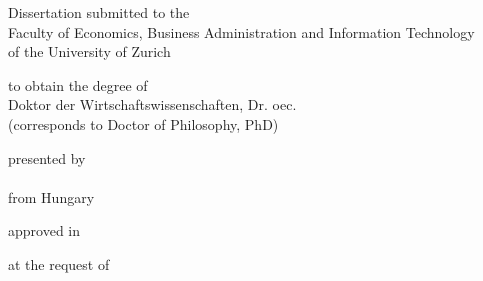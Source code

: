 \makeatletter
    \let\inserttitle\@title
    \let\insertauthor\@author
    \let\insertdate\@date
    \let\insertchairman\@chairman
    \let\insertcommittee\@committee
\makeatother

\begin{titlepage}
    \begin{doublespace}
    \begin{center}
        \vspace*{3cm}

        \begin{LARGE}
            \textbf{\inserttitle}
        \end{LARGE}

        \vfill

        \begin{large}
            Dissertation submitted to the\\Faculty of Economics, Business Administration and Information Technology\\of the University of Zurich
        \end{large}
 
        \vfill

        \begin{large}
            to obtain the degree of\\
            Doktor der Wirtschaftswissenschaften, Dr. oec.\\
            (corresponds to Doctor of Philosophy, PhD)
        \end{large}

        \vfill

        \begin{large}
            presented by\\
            \textbf{\insertauthor}\\
            from Hungary
        \end{large}

        \vfill

        \begin{large}
            approved in \monthyeardate\insertdate
        \end{large}

        \vfill

        \begin{large}
            at the request of\\\insertcommittee
        \end{large}

    \vspace*{1cm}

    \end{center}
    \end{doublespace}
\end{titlepage}
